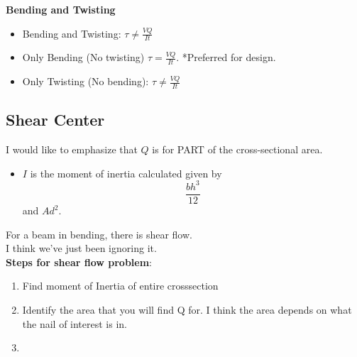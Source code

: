 \documentclass{article}
\numberwithin{equation}{subsection}
\begin{document}
\textbf{Bending and Twisting}
\begin{itemize}
  \item Bending and Twisting: $\tau \neq \frac{VQ}{It}$
  \item Only Bending (No twisting) $\tau = \frac{VQ}{It}$. *Preferred for design.
  \item Only Twisting (No bending): $\tau \neq \frac{VQ}{It}$
\end{itemize}

\subsection{Shear Center}

\newpage
I would like to emphasize that $Q$ is for PART of the cross-sectional area. \\

\begin{itemize}
  \item $I$ is the moment of inertia calculated given by $$\frac{bh^3}{12}$$ and $Ad^2$.
\end{itemize}


For a beam in bending, there is shear flow. \\

I think we've just been ignoring it. \\

\textbf{Steps for shear flow problem}:
\begin{enumerate}
  \item Find moment of Inertia of entire crosssection
  \item Identify the area that you will find Q for. I think the area depends on what the nail of interest is in.
  \item 
\end{enumerate}
\end{document}
